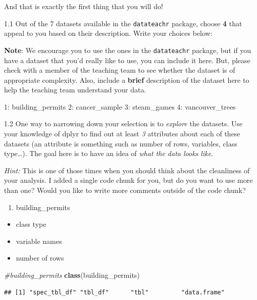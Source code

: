 \documentclass[
]{article}
\newenvironment{Shaded}{\begin{snugshade}}{\end{snugshade}}
\newcommand{\CommentTok}[1]{\textcolor[rgb]{0.56,0.35,0.01}{\textit{#1}}}
\newcommand{\KeywordTok}[1]{\textcolor[rgb]{0.13,0.29,0.53}{\textbf{#1}}}
\newcommand{\NormalTok}[1]{#1}
\providecommand{\tightlist}{%
  \setlength{\itemsep}{0pt}\setlength{\parskip}{0pt}}
\begin{document}
And that is exactly the first thing that you will do!

1.1 Out of the 7 datasets available in the \texttt{datateachr} package,
choose \textbf{4} that appeal to you based on their description. Write
your choices below:

\textbf{Note}: We encourage you to use the ones in the
\texttt{datateachr} package, but if you have a dataset that you'd really
like to use, you can include it here. But, please check with a member of
the teaching team to see whether the dataset is of appropriate
complexity. Also, include a \textbf{brief} description of the dataset
here to help the teaching team understand your data.

1: building\_permits 2: cancer\_sample 3: steam\_games 4:
vancouver\_trees

1.2 One way to narrowing down your selection is to \emph{explore} the
datasets. Use your knowledge of dplyr to find out at least \emph{3}
attributes about each of these datasets (an attribute is something such
as number of rows, variables, class type\ldots). The goal here is to
have an idea of \emph{what the data looks like}.

\emph{Hint:} This is one of those times when you should think about the
cleanliness of your analysis. I added a single code chunk for you, but
do you want to use more than one? Would you like to write more comments
outside of the code chunk?

\begin{enumerate}
\def\labelenumi{\arabic{enumi}.}
\tightlist
\item
  building\_permits
\end{enumerate}

\begin{itemize}
\tightlist
\item
  class type
\item
  variable names
\item
  number of rows
\end{itemize}

\begin{Shaded}
\begin{Highlighting}[]
\CommentTok{\#building\_permits}
\KeywordTok{class}\NormalTok{(building\_permits)}
\end{Highlighting}
\end{Shaded}

\begin{verbatim}
## [1] "spec_tbl_df" "tbl_df"      "tbl"         "data.frame"
\end{verbatim}
\end{document}
